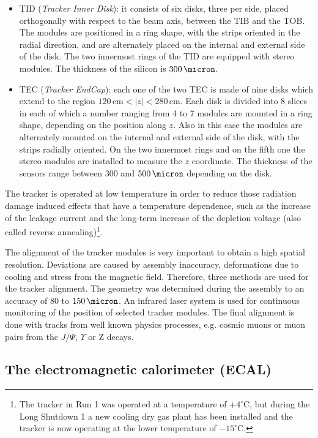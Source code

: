 \begin{itemize}
\item TID (\emph{Tracker Inner Disk}): it consists of six disks, three per side, placed orthogonally with respect to the beam axis, between the TIB and the TOB. The modules are positioned in a ring shape, with the strips oriented in the radial direction, and are alternately placed on the internal and external side of the disk. The two innermost rings of the TID are equipped with stereo modules. The thickness of the silicon is $300\,\micron$.
\item TEC (\emph{Tracker EndCap}): each one of the two TEC is made of nine disks which extend to the region $120\,\mathrm{cm} < |z| < 280\,\mathrm{cm}$. Each disk is divided into 8 slices in each of which a number ranging from 4 to 7 modules are mounted in a ring shape, depending on the position along $z$. Also in this case the modules are alternately mounted on the internal and external side of the disk, with the strips radially oriented. On the two innermost rings and on the fifth one the stereo modules are installed to measure the $z$ coordinate. The thickness of the sensors range between 300 and $500\,\micron$ depending on the disk.
\end{itemize}
The tracker is operated at low temperature in order to reduce those radiation damage induced effects that have a temperature dependence, such as the increase of the leakage current and the long-term increase of the depletion voltage (also called reverse annealing)\footnote{The tracker in Run 1 was operated at a temperature of $+4^{\circ}$C, but during the Long Shutdown 1 a new cooling dry gas plant has been installed and the tracker is now operating at the lower temperature of $-15^{\circ}$C.}.

The alignment of the tracker modules is very important to obtain a high spatial resolution. Deviations are caused by assembly inaccuracy, deformations due to cooling and stress from the magnetic field. Therefore, three methods are used for the tracker alignment.
The geometry was determined during the assembly to an accuracy of 80 to $150\,\micron$. An infrared laser system is used for continuous monitoring of the position of selected tracker modules. The final alignment is done with tracks from well known physics processes, e.g. cosmic muons or muon pairs from the $J/\Psi$, $\Upsilon$ or Z decays.

\subsection{The electromagnetic calorimeter (ECAL)}


